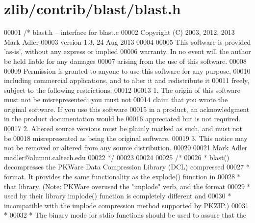 \hypertarget{zlib_2contrib_2blast_2blast_8h_source}{}\section{zlib/contrib/blast/blast.h}
\label{zlib_2contrib_2blast_2blast_8h_source}

\begin{DoxyCode}
00001 \textcolor{comment}{/* blast.h -- interface for blast.c}
00002 \textcolor{comment}{  Copyright (C) 2003, 2012, 2013 Mark Adler}
00003 \textcolor{comment}{  version 1.3, 24 Aug 2013}
00004 \textcolor{comment}{}
00005 \textcolor{comment}{  This software is provided 'as-is', without any express or implied}
00006 \textcolor{comment}{  warranty.  In no event will the author be held liable for any damages}
00007 \textcolor{comment}{  arising from the use of this software.}
00008 \textcolor{comment}{}
00009 \textcolor{comment}{  Permission is granted to anyone to use this software for any purpose,}
00010 \textcolor{comment}{  including commercial applications, and to alter it and redistribute it}
00011 \textcolor{comment}{  freely, subject to the following restrictions:}
00012 \textcolor{comment}{}
00013 \textcolor{comment}{  1. The origin of this software must not be misrepresented; you must not}
00014 \textcolor{comment}{     claim that you wrote the original software. If you use this software}
00015 \textcolor{comment}{     in a product, an acknowledgment in the product documentation would be}
00016 \textcolor{comment}{     appreciated but is not required.}
00017 \textcolor{comment}{  2. Altered source versions must be plainly marked as such, and must not be}
00018 \textcolor{comment}{     misrepresented as being the original software.}
00019 \textcolor{comment}{  3. This notice may not be removed or altered from any source distribution.}
00020 \textcolor{comment}{}
00021 \textcolor{comment}{  Mark Adler    madler@alumni.caltech.edu}
00022 \textcolor{comment}{ */}
00023 
00024 
00025 \textcolor{comment}{/*}
00026 \textcolor{comment}{ * blast() decompresses the PKWare Data Compression Library (DCL) compressed}
00027 \textcolor{comment}{ * format.  It provides the same functionality as the explode() function in}
00028 \textcolor{comment}{ * that library.  (Note: PKWare overused the "implode" verb, and the format}
00029 \textcolor{comment}{ * used by their library implode() function is completely different and}
00030 \textcolor{comment}{ * incompatible with the implode compression method supported by PKZIP.)}
00031 \textcolor{comment}{ *}
00032 \textcolor{comment}{ * The binary mode for stdio functions should be used to assure that the}

\end{DoxyCode}
